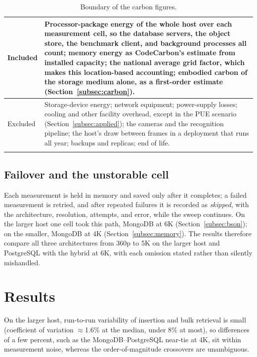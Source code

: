 \documentclass[pdflatex,sn-basic]{sn-jnl}%
\begin{document}
\begin{table}[htbp]
\color{markup}
\caption{Boundary of the carbon figures.}\label{tab:boundary}
\small
\begin{tabular}{@{}p{}p{}@{}}
\toprule
Included & Processor-package energy of the whole host over each measurement cell, so the database servers, the object store, the benchmark client, and background processes all count; memory energy as CodeCarbon's estimate from installed capacity; the national average grid factor, which makes this location-based accounting; embodied carbon of the storage medium alone, as a first-order estimate (Section~\ref{subsec:carbon}). \\
\midrule
Excluded & Storage-device energy; network equipment; power-supply losses; cooling and other facility overhead, except in the PUE scenario (Section~\ref{subsec:applied}); the cameras and the recognition pipeline; the host's draw between frames in a deployment that runs all year; backups and replicas; end of life. \\
\botrule
\end{tabular}
\end{table}

\subsection{Failover and the unstorable cell}\label{subsec:failover}
{\color{markup}Each measurement is held in memory and saved only after it completes; a failed measurement is retried, and after repeated failures it is recorded as \emph{skipped}, with the architecture, resolution, attempts, and error, while the sweep continues.} {\color{markup}On the larger host one cell took this path, MongoDB at 6K (Section~\ref{subsec:bson}); on the smaller, MongoDB at 4K (Section~\ref{subsec:memory}).} {\color{markup}The results therefore compare all three architectures from 360p to 5K on the larger host and PostgreSQL with the hybrid at 6K, with each omission stated rather than silently mishandled.}

\section{Results}\label{sec:results}

{\color{markup}On the larger host, run-to-run variability of insertion and bulk retrieval is small (coefficient of variation $\approx$1.6\% at the median, under 8\% at most), so differences of a few percent, such as the MongoDB--PostgreSQL near-tie at 4K, sit within measurement noise, whereas the order-of-magnitude crossovers are unambiguous.}
\end{document}
